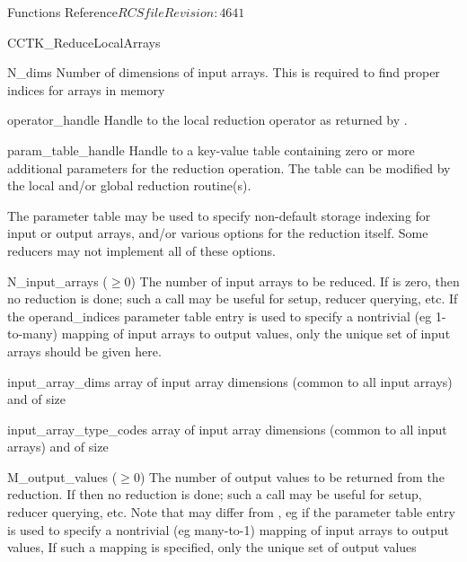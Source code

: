 \begin{cactuspart}{ Functions Reference}{$RCSfile$}{$Revision: 4641 $}
\begin{FunctionDescription}{CCTK\_ReduceLocalArrays}
\begin{ParameterSection}
\begin{Parameter}{N\_dims}
Number of dimensions of input arrays. This is required to find proper indices
for arrays in memory
\end{Parameter}
\begin{Parameter}{operator\_handle}
Handle to the local reduction operator as returned by \newline
{}.
\end{Parameter}
\begin{Parameter}{param\_table\_handle}
Handle to a key-value table containing zero or more additional parameters
for the reduction operation. The table can be modified by the local
and/or global reduction routine(s).

The parameter table may be used to specify non-default storage indexing
for input or output arrays, and/or various options for the reduction
itself.  Some reducers may not implement all of these options.
\begin{Parameter}{N\_input\_arrays ($\ge 0$)}
The number of input arrays to be reduced.  If   is zero,
then no reduction is done; such a call may be useful for setup,
reducer querying, etc.  If the  operand\_indices  parameter table
entry is used to specify a nontrivial (eg 1-to-many) mapping of input
arrays to output values, only the unique set of input arrays should
be given here.
\end{Parameter}
\begin{Parameter}{input\_array\_dims}
array of input array dimensions (common to all input arrays) and of size 
\end{Parameter}
\end{Parameter}
\begin{Parameter}{input\_array\_type\_codes}
array of input array dimensions (common to all input arrays) and of size 
\end{Parameter}
\begin{Parameter}{M\_output\_values ($\ge 0$)}
The number of output values to be returned from the reduction.
If   then no reduction is done; such a call
may be useful for setup, reducer querying, etc.  Note that
  may differ from   , eg if the
  parameter table entry is used to specify a
nontrivial (eg many-to-1) mapping of input arrays to output values,
If such a mapping is specified, only the unique set of output values

\end{Parameter}
\end{ParameterSection}
\end{FunctionDescription}
\end{cactuspart}
